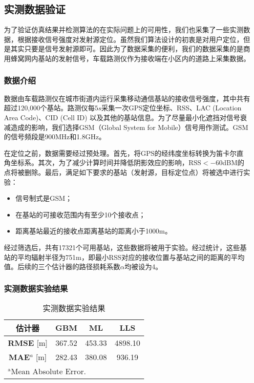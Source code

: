 \subsection{实测数据验证}

为了验证仿真结果并检测算法的在实际问题上的可用性，我们也采集了一些实测数据，根据接收信号强度对发射源定位。虽然我们算法设计的初衷是对用户定位，但是其实只要是信号发射源即可。因此为了数据采集的便利，我们的数据采集的是商用蜂窝网内基站的发射信号，车载路测仪作为接收端在小区内的道路上采集数据。

\subsubsection{数据介绍}

数据由车载路测仪在城市街道内运行采集移动通信基站的接收信号强度，其中共有超过120,000个基站。路测仪每$5s$采集一次GPS定位坐标、RSS、LAC (Location Area Code)、CID (Cell ID) 以及其他的基站信息。为了尽量最小化遮挡对信号衰减造成的影响，我们选择GSM（Global System for Mobile）信号用作测试。GSM的信号频段是900MHz和1.8GHz。

在定位之前，数据需要经过预处理。首先，将GPS的经纬度坐标转换为笛卡尔直角坐标系。其次，为了减少计算时间并降低阴影效应的影响，RSS$<-60$dBM的点将被删除。最后，满足如下要求的基站（发射源，目标定位点）将被选中进行实验：
\begin{itemize}
	\item 信号制式是GSM；
	\item 在基站的可接收范围内有至少10个接收点；
	\item 距离基站最近的接收点距离基站的距离小于1000m。
\end{itemize}

经过筛选后，共有17321个可用基站，这些数据将被用于实验。经过统计，这些基站的平均辐射半径为751m，即最小RSS对应的接收位置与基站之间的距离的平均值。后续的三个估计器的路径损耗系数$\alpha$均被设为4。

\subsubsection{实测数据实验结果}

\begin{table}[tbp]
	\caption{实测数据实验结果}
	\begin{center}
		\begin{tabular}{cccc}
			\toprule
			\textbf{估计器} & \textbf{GBM} & \textbf{ML} & \textbf{LLS} \\
			\midrule
			\textbf{RMSE} [m] & 367.52 & 453.33 & 4898.10 \\
			\midrule
			\textbf{MAE}$^{a}$ [m] & 282.43 & 380.08 & 936.19 \\
			\bottomrule
			\multicolumn{3}{l}{$^{\mathrm{a}}$Mean Absolute Error.}
		\end{tabular}
		\label{tab:transmitter}
	\end{center}
\end{table}

